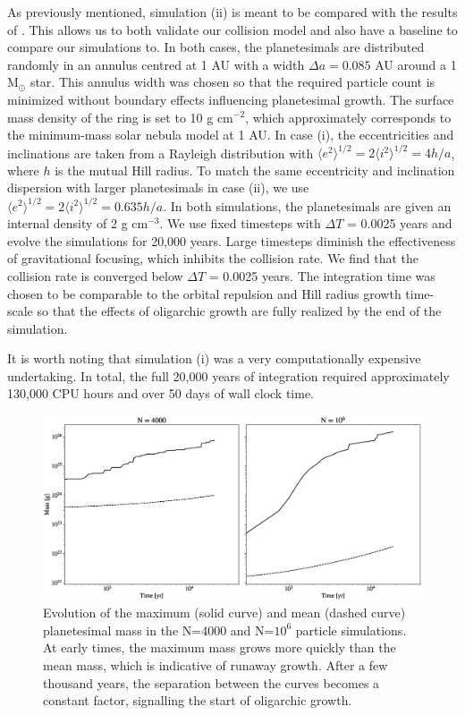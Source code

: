 \noindent As previously mentioned, simulation (ii) is meant to be compared with the results of \cite{kokubo98}. This allows us to 
both validate our collision model and also have a baseline to compare our simulations to. In both cases, the planetesimals are 
distributed randomly in an annulus centred at 1 AU with a width $\Delta a = 0.085$ AU around a 1 $\mathrm{M_{\odot}}$ star. 
This annulus width was chosen so that the required particle count is minimized without boundary effects influencing planetesimal 
growth. The surface mass density of the ring is set to 10 g cm$^{-2}$, which approximately corresponds to the minimum-mass 
solar nebula model \cite{hayashi81} at 1 AU. In case (i), the eccentricities and inclinations are taken from a Rayleigh distribution 
\cite{ida92} with $\langle e^2 \rangle^{1/2} = 2 \langle i^2 \rangle^{1/2} = 4 h/a$, where $h$ is the mutual Hill radius. To match 
the same eccentricity and inclination dispersion with larger planetesimals in case (ii), we use $\langle e^2 \rangle^{1/2} = 2 
\langle i^2 \rangle^{1/2} = 0.635 h/a$. In both simulations, the planetesimals are given an internal density of 2 g cm$^{-3}$. We 
use fixed timesteps with $\Delta T$ = 0.0025 years and evolve the simulations for 20,000 years. Large timesteps diminish the 
effectiveness of gravitational focusing, which inhibits the collision rate. We find that the collision rate is converged below $\Delta 
T$ = 0.0025 years. The integration time was chosen to be comparable to the orbital repulsion and Hill radius growth time-scale 
\cite{kokubo95} so that the effects of oligarchic growth are fully realized by the end of the simulation.

It is worth noting that simulation (i) was a very computationally expensive undertaking. In total, the full 20,000 years of 
integration required approximately 130,000 CPU hours and over 50 days of wall clock time.

\begin{figure}
    \includegraphics[width=\textwidth]{figures/plSS/mass_evo.eps}
    \caption{Evolution of the maximum (solid curve) and mean (dashed curve) planetesimal mass in the N=4000 and N=$10^6$ particle simulations. At early times, the maximum mass grows more quickly than the mean mass, which is indicative of runaway growth. After a few thousand years, the separation between the curves becomes a constant factor, signalling the start of oligarchic growth.
    \label{fig:mass_evo}}
\end{figure}

